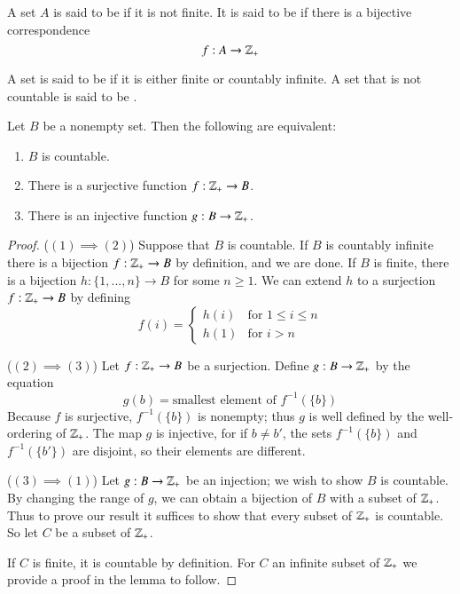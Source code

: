    
    \begin{definition}
        A set $A$ is said to be  if it is not finite. It is said to be  if there is a bijective correspondence \begin{equation*}
            f:A\rightarrow \mathbb Z_+
        \end{equation*}
    \end{definition}


    \begin{definition}
        A set is said to be  if it is either finite or countably infinite. A set that is not countable is said to be .
    \end{definition}

    \begin{theorem}
        Let $B$ be a nonempty set. Then the following are equivalent:\begin{enumerate}
            \item $B$ is countable.
            \item There is a surjective function $f:\mathbb Z_+\rightarrow B$.
            \item There is an injective function $g:B\rightarrow \mathbb Z_+$.
        \end{enumerate}
    \end{theorem}
    \begin{proof}
        ($(1)\implies(2)$) Suppose that $B$ is countable. If $B$ is countably infinite there is a bijection $f:\mathbb Z_+\rightarrow B$ by definition, and we are done. If $B$ is finite, there is a bijection $h:\{1,...,n\}\rightarrow B$ for some $n \geq 1$. We can extend $h$ to a surjection $f:\mathbb Z_+\rightarrow B$ by defining \begin{equation*}
            f(i) = \left\{\begin{array}{ll} h(i) & \text{for } 1\leq i \leq n \\
            h(1) & \text{for } i > n \end{array}\right.
        \end{equation*}

        ($(2)\implies (3)$) Let $f:\mathbb Z_+\rightarrow B$ be a surjection. Define $g:B\rightarrow \mathbb Z_+$ by the equation \begin{equation*}
            g(b) = \text{smallest element of $f^{-1}(\{b\})$}
        \end{equation*}
        Because $f$ is surjective, $f^{-1}(\{b\})$ is nonempty; thus $g$ is well defined by the well-ordering of $\mathbb Z_+$. The map $g$ is injective, for if $b \neq b'$, the sets $f^{-1}(\{b\})$ and $f^{-1}(\{b'\})$ are disjoint, so their elements are different.

        ($(3)\implies (1)$) Let $g:B\rightarrow \mathbb Z_+$ be an injection; we wish to show $B$ is countable. By changing the range of $g$, we can obtain a bijection of $B$ with a subset of $\mathbb Z_+$. Thus to prove our result it suffices to show that every subset of $\mathbb Z_+$ is countable. So let $C$ be a subset of $\mathbb Z_+$.

        If $C$ is finite, it is countable by definition. For $C$ an infinite subset of $\mathbb Z_+$ we provide a proof in the lemma to follow.
    \end{proof}


